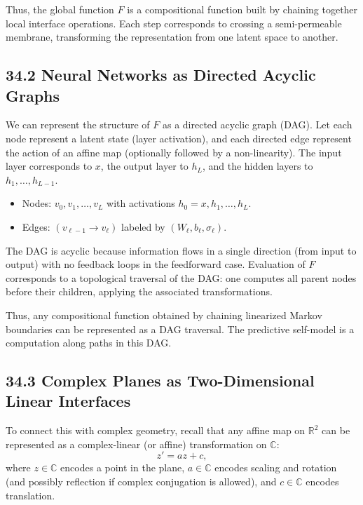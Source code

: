 \documentclass[12pt,letterpaper]{article}
\theoremstyle{remark}
\begin{document}
Thus, the global function $F$ is a compositional function built by chaining together local interface operations. Each step corresponds to crossing a semi-permeable membrane, transforming the representation from one latent space to another.

\subsection{34.2 Neural Networks as Directed Acyclic Graphs}

We can represent the structure of $F$ as a directed acyclic graph (DAG). Let each node represent a latent state (layer activation), and each directed edge represent the action of an affine map (optionally followed by a non-linearity). The input layer corresponds to $x$, the output layer to $h_L$, and the hidden layers to $h_1, \dots, h_{L-1}$.

\begin{itemize}
    \item Nodes: $v_0, v_1, \dots, v_L$ with activations $h_0 = x, h_1, \dots, h_L$.
    \item Edges: $(v_{\ell-1} \to v_\ell)$ labeled by $(W_\ell, b_\ell, \sigma_\ell)$.
\end{itemize}

The DAG is acyclic because information flows in a single direction (from input to output) with no feedback loops in the feedforward case. Evaluation of $F$ corresponds to a topological traversal of the DAG: one computes all parent nodes before their children, applying the associated transformations.

Thus, any compositional function obtained by chaining linearized Markov boundaries can be represented as a DAG traversal. The predictive self-model is a computation along paths in this DAG.

\subsection{34.3 Complex Planes as Two-Dimensional Linear Interfaces}

To connect this with complex geometry, recall that any affine map on $\mathbb{R}^2$ can be represented as a complex-linear (or affine) transformation on $\mathbb{C}$:
\[
z' = a z + c,
\]
where $z \in \mathbb{C}$ encodes a point in the plane, $a \in \mathbb{C}$ encodes scaling and rotation (and possibly reflection if complex conjugation is allowed), and $c \in \mathbb{C}$ encodes translation.
\end{document}
